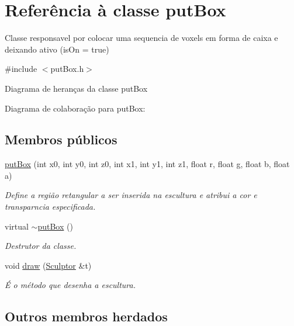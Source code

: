 \hypertarget{classput_box}{}\section{Referência à classe put\+Box}
\label{classput_box}


Classe responsavel por colocar uma sequencia de voxels em forma de caixa e deixando ativo (is\+On = true)  




{\ttfamily \#include $<$put\+Box.\+h$>$}



Diagrama de heranças da classe put\+Box


Diagrama de colaboração para put\+Box\+:
\subsection*{Membros públicos}
\begin{DoxyCompactItemize}
\item 
\hyperlink{classput_box_a8bff4dd8586da4db658771e19e14f08e}{put\+Box} (int x0, int y0, int z0, int x1, int y1, int z1, float r, float g, float b, float a)
\begin{DoxyCompactList}\small\item\em Define a região retangular a ser inserida na escultura e atribui a cor e transparncia especificada. \end{DoxyCompactList}\item 
\mbox{\label{classput_box_a2be61d9d564b088341c890149e6f7aab}} 
virtual \hyperlink{classput_box_a2be61d9d564b088341c890149e6f7aab}{$\sim$put\+Box} ()
\begin{DoxyCompactList}\small\item\em Destrutor da classe. \end{DoxyCompactList}\item 
void \hyperlink{classput_box_afd85072811169fc9f25435de046a101e}{draw} (\hyperlink{class_sculptor}{Sculptor} \&t)
\begin{DoxyCompactList}\small\item\em É o método que desenha a escultura. \end{DoxyCompactList}\end{DoxyCompactItemize}
\subsection*{Outros membros herdados}


